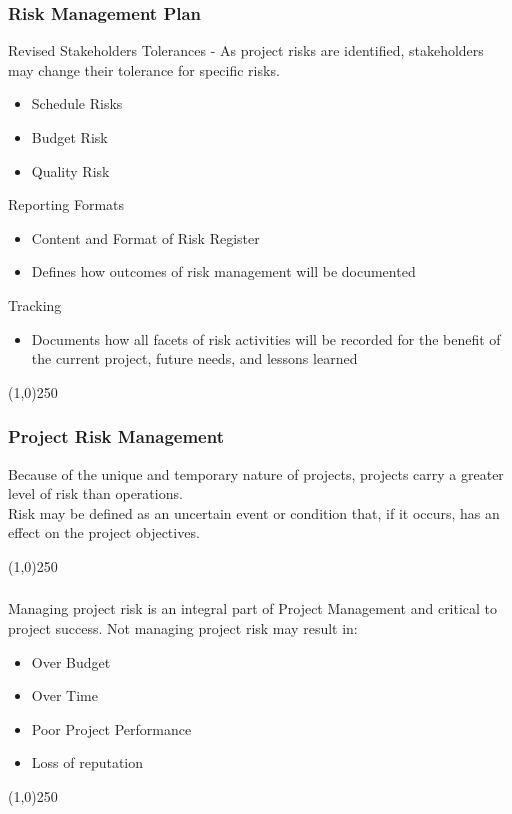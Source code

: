 \begin{frame}
\frametitle{Risk Management Plan}
Revised Stakeholders Tolerances - As project risks are identified, stakeholders may change their tolerance for specific risks.
\begin{itemize}
	\item Schedule Risks
	\item Budget Risk
	\item Quality Risk
\end{itemize}
Reporting Formats
\begin{itemize}
	\item Content and Format of Risk Register
	\item Defines how outcomes of risk management will be documented
\end{itemize}
Tracking
\begin{itemize}
	\item Documents how all facets of risk activities will be recorded for the benefit of the current project, future needs, and lessons learned
\end{itemize}
\end{frame}\begin{center}\line(1,0){250}\end{center}




\begin{frame}
\frametitle{Project Risk Management}
Because of the unique and temporary nature of projects, projects carry a greater level of risk than operations.\\

Risk may be defined as an uncertain event or condition that, if it occurs, has an effect on the project objectives.\\

\end{frame}\begin{center}\line(1,0){250}\end{center}






\begin{frame}
\frametitle{}
Managing project risk is an integral part of Project Management and critical to project success. 
Not managing project risk may result in:
\begin{itemize}
	\item Over Budget
	\item Over Time
	\item Poor Project Performance
	\item Loss of reputation
\end{itemize}
\end{frame}\begin{center}\line(1,0){250}\end{center}





